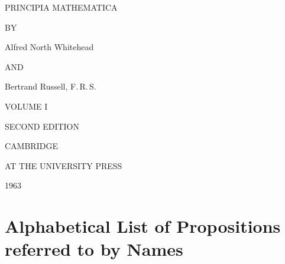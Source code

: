 \documentclass{scrartcl}
\begin{document}
{\hfill\Huge PRINCIPIA MATHEMATICA\hfill}

\vspace{4em}

{\hfill BY\hfill}

\vspace{4em}

{\hfill\LARGE Alfred North Whitehead\hfill}

\vspace{4em}

{\hfill AND \hfill}

\vspace{4em}

{\hfill\LARGE Bertrand Russell, F.\,R.\,S.\hfill}

\vspace{20em}

{\hfill\Large VOLUME I\hfill}

\vspace{4em}

{\hfill\large SECOND EDITION\hfill}

\vspace{4em}

{\hfill\large CAMBRIDGE\hfill}

{\hfill\large AT THE UNIVERSITY PRESS\hfill}

{\hfill\large 1963\hfill}

\clearpage

\section{Alphabetical List of Propositions referred to by Names}
\end{document}
